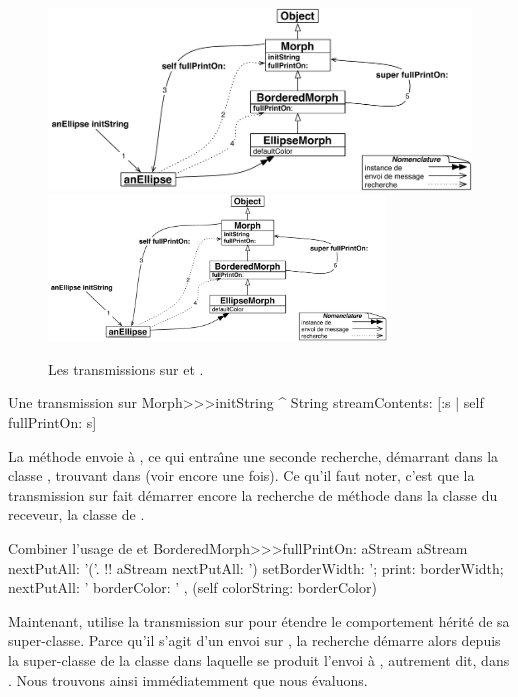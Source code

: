 \documentclass[a4paper,10pt,twoside]{book}
\begin{document}
\begin{figure}[htb]
\begin{center}
\ifluluelse
	{\includegraphics[width=\textwidth]{initStringLookup}}
	{\includegraphics[width=0.8\textwidth]{initStringLookup}}
\caption{Les transmissions sur \self et \super.\label{fig:initStringLookup}}
\end{center}
\end{figure}

\begin{method}[initString]{Une transmission sur \self}
Morph>>>initString
	^ String streamContents: [:s | self fullPrintOn: s]
\end{method}
La m\'ethode  envoie  \`a \self,
ce qui entra\^{\i}ne une seconde recherche, d\'emarrant dans la classe
, trouvant  dans  (voir  encore une fois).
Ce qu'il faut noter, c'est que la transmission sur \self
fait d\'emarrer encore la recherche de m\'ethode dans la classe du 
receveur, \ie la classe de
.


\begin{method}[fullPrintOn]{Combiner l'usage de \super et \self}
BorderedMorph>>>fullPrintOn: aStream
	aStream nextPutAll: '('.
	!!
	aStream nextPutAll: ') setBorderWidth: '; print: borderWidth;
		nextPutAll: ' borderColor: ' , (self colorString: borderColor)
\end{method}
Maintenant,  utilise la transmission sur \super pour \'etendre le comportement  h\'erit\'e de sa super-classe.
Parce qu'il s'agit d'un envoi sur \super, la recherche d\'emarre alors
depuis la super-classe de la classe dans laquelle se produit l'envoi \`a
\super, autrement dit, dans 
.
Nous trouvons ainsi imm\'ediatemment  que nous \'evaluons.
\end{document}
